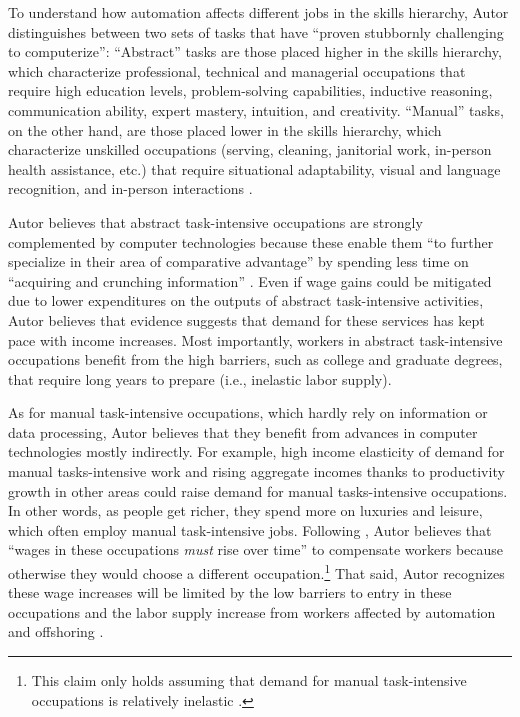 \documentclass[version=last,draft=false,paper=A4,portrait,twoside=true,twocolumn=false,headinclude=false,footinclude=false,fontsize=12,BCOR=20mm,DIV=calc,pagesize=auto,titlepage=firstiscover,mpinclude=false,open=right,chapterprefix=true,numbers=autoendperiod,headsepline=false,headings=twolinechapter,parskip=false]{scrbook}
\begin{document}
To understand how automation affects different jobs in the skills
hierarchy, Autor distinguishes between two sets of tasks that have ``proven
stubbornly challenging to computerize'': ``Abstract'' tasks are those
placed higher in the skills hierarchy, which characterize professional,
technical and managerial occupations that require high education levels,
problem-solving capabilities, inductive reasoning, communication ability,
expert mastery, intuition, and creativity. ``Manual'' tasks, on the other
hand, are those placed lower in the skills hierarchy, which characterize
unskilled occupations (serving, cleaning, janitorial work, in-person health
assistance, etc.) that require situational adaptability, visual and
language recognition, and in-person interactions \autocite[9]{autor2015}.

Autor believes that abstract task-intensive occupations are strongly
complemented by computer technologies because these enable them ``to
further specialize in their area of comparative advantage'' by spending
less time on ``acquiring and crunching information''
\autocite[15]{autor2015}. Even if wage gains could be mitigated due to
lower expenditures on the outputs of abstract task-intensive activities,
Autor believes that evidence suggests that demand for these services has
kept pace with income increases. Most importantly, workers in abstract
task-intensive occupations benefit from the high barriers, such as college
and graduate degrees, that require long years to prepare (i.e., inelastic
labor supply).

As for manual task-intensive occupations, which hardly rely on information
or data processing, Autor believes that they benefit from advances in
computer technologies mostly indirectly. For example, high income
elasticity of demand for manual tasks-intensive work and rising aggregate
incomes thanks to productivity growth in other areas could raise demand for
manual tasks-intensive occupations. In other words, as people get richer,
they spend more on luxuries and leisure, which often employ manual
task-intensive jobs. Following \textcite{baumol1967}, Autor believes that
``wages in these occupations \emph{must} rise over time'' to compensate workers
because otherwise they would choose a different occupation.\footnote{This claim only holds assuming that demand for manual task-intensive
occupations is relatively inelastic \autocite[17]{autor2015}.} That
said, Autor recognizes these wage increases will be limited by the low
barriers to entry in these occupations and the labor supply increase from
workers affected by automation and offshoring \autocite[17]{autor2015}.
\end{document}
